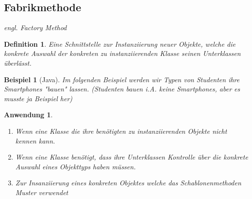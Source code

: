 \documentclass[a4paper]{article}
\theoremstyle{break}
\newtheorem{defi}{Definition}[section]
\newtheorem{ex}{Beispiel}[section]
\newtheorem{why}{Anwendung}[section]
\begin{document}
\newpage
\subsection{Fabrikmethode}

\textit{engl. Factory Method}

\begin{defi}
	Eine Schnittstelle zur Instanziierung neuer Objekte, welche die konkrete Auswahl der konkreten zu instanziierenden Klasse seinen Unterklassen überlässt.
\end{defi}

\begin{ex}[Java]
	Im folgenden Beispiel werden wir Typen von Studenten ihre Smartphones "bauen" lassen. (Studenten bauen i.A. keine Smartphones, aber es musste ja Beispiel her)

	
	
	
	
	
	
	
\end{ex}

\begin{why}
	\begin{enumerate}
		\item 	Wenn eine Klasse die ihre benötigten zu instanziierenden Objekte nicht kennen kann.
		\item Wenn eine Klasse benötigt, dass ihre Unterklassen Kontrolle über die konkrete Auswahl eines Objekttyps haben müssen.
		\item Zur Insanziierung eines konkreten Objektes welche das Schablonenmethoden Muster verwendet
	\end{enumerate}

	
\end{why}


	
\end{document}
